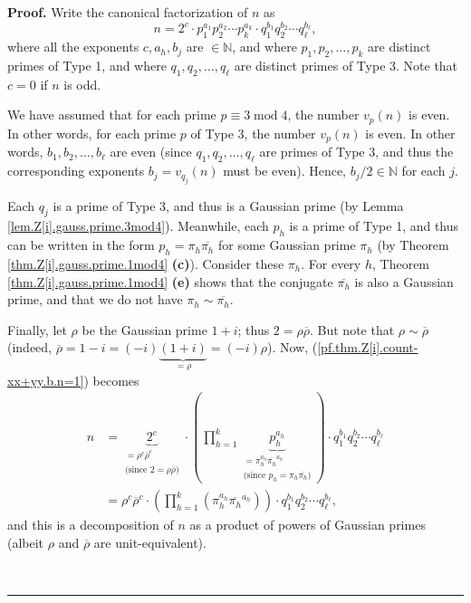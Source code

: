 \documentclass[numbers=enddot,12pt,final,onecolumn,notitlepage]{scrartcl}%
\numberwithin{exer}{subsection}
\theoremstyle{definition}
\newenvironment{proof}[1][Proof]{\noindent\textbf{#1.} }{\ \rule{0.5em}{0.5em}}
\let\prodnonlimits\prod
\renewcommand{\prod}{\prodnonlimits\limits}
\begin{document}
\begin{proof}
Write the canonical factorization of $n$ as
\begin{equation}
n=2^{c}\cdot p_{1}^{a_{1}}p_{2}^{a_{2}}\cdots p_{k}^{a_{k}}\cdot q_{1}^{b_{1}%
}q_{2}^{b_{2}}\cdots q_{\ell}^{b_{\ell}},
\label{pf.thm.Z[i].count-xx+yy.b.n=1}%
\end{equation}
where all the exponents $c,a_{h},b_{j}$ are $\in\mathbb{N}$, and where
$p_{1},p_{2},\ldots,p_{k}$ are distinct primes of Type 1, and where
$q_{1},q_{2},\ldots,q_{\ell}$ are distinct primes of Type 3. Note that $c=0$
if $n$ is odd.

We have assumed that for each prime $p\equiv3\operatorname{mod}4$, the number
$v_{p}\left(  n\right)  $ is even. In other words, for each prime $p$ of Type
3, the number $v_{p}\left(  n\right)  $ is even. In other words, $b_{1}%
,b_{2},\ldots,b_{\ell}$ are even (since $q_{1},q_{2},\ldots,q_{\ell}$ are
primes of Type 3, and thus the corresponding exponents $b_{j}=v_{q_{j}}\left(
n\right)  $ must be even). Hence, $b_{j}/2\in\mathbb{N}$ for each $j$.

Each $q_{j}$ is a prime of Type 3, and thus is a Gaussian prime (by Lemma
\ref{lem.Z[i].gauss.prime.3mod4}). Meanwhile, each $p_{h}$ is a prime of Type
1, and thus can be written in the form $p_{h}=\pi_{h}\overline{\pi_{h}}$ for
some Gaussian prime $\pi_{h}$ (by Theorem \ref{thm.Z[i].gauss.prime.1mod4}
\textbf{(c)}). Consider these $\pi_{h}$. For every $h$, Theorem
\ref{thm.Z[i].gauss.prime.1mod4} \textbf{(e)} shows that the conjugate
$\overline{\pi_{h}}$ is also a Gaussian prime, and that we do not have
$\pi_{h}\sim\overline{\pi_{h}}$.

Finally, let $\rho$ be the Gaussian prime $1+i$; thus $2=\rho\overline{\rho}$.
But note that $\rho\sim\overline{\rho}$ (indeed, $\overline{\rho}=1-i=\left(
-i\right)  \underbrace{\left(  1+i\right)  }_{=\rho}=\left(  -i\right)  \rho
$). Now, (\ref{pf.thm.Z[i].count-xx+yy.b.n=1}) becomes%
\begin{align}
n  &  =\underbrace{2^{c}}_{\substack{=\rho^{c}\overline{\rho}^{c}%
\\\text{(since }2=\rho\overline{\rho}\text{)}}}\cdot\left(  \prod_{h=1}%
^{k}\underbrace{p_{h}^{a_{h}}}_{\substack{=\pi_{h}^{a_{h}}\overline{\pi_{h}%
}^{a_{h}}\\\text{(since }p_{h}=\pi_{h}\overline{\pi_{h}}\text{)}}}\right)
\cdot q_{1}^{b_{1}}q_{2}^{b_{2}}\cdots q_{\ell}^{b_{\ell}}\nonumber\\
&  =\rho^{c}\overline{\rho}^{c}\cdot\left(  \prod_{h=1}^{k}\left(  \pi
_{h}^{a_{h}}\overline{\pi_{h}}^{a_{h}}\right)  \right)  \cdot q_{1}^{b_{1}%
}q_{2}^{b_{2}}\cdots q_{\ell}^{b_{\ell}},
\label{pf.thm.Z[i].count-xx+yy.b.n=2}%
\end{align}
and this is a decomposition of $n$ as a product of powers of Gaussian primes
(albeit $\rho$ and $\overline{\rho}$ are unit-equivalent).


\end{proof}
\end{document}
